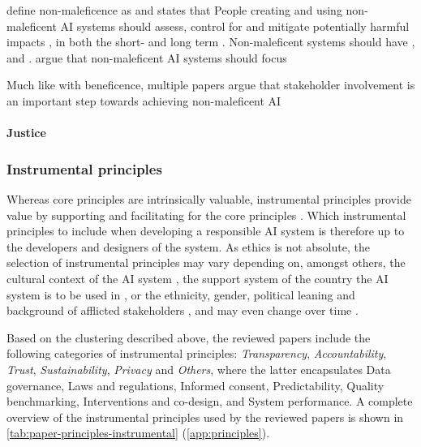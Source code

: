 \textcite[p. 6]{Doorn_2021} define non-maleficence as  and states that  People creating and using non-maleficent AI systems should assess, control for and mitigate potentially harmful impacts \parencite[p. 2]{Buhmann_2021}, in both the short- and long term \parencite[p. 416]{Clarke_2019}. Non-maleficent systems should have  \parencite[p. 416]{Clarke_2019}, and  \parencite[p. 2]{Buhmann_2021}. \textcite[p. 13]{Anagnostou_2022} argue that non-maleficent AI systems should focus  %


Much like with beneficence, multiple papers argue that stakeholder involvement is an important step towards achieving non-maleficent AI \parencite[p. 416]{Clarke_2019}


\paragraph{Justice}


\subsubsection{Instrumental principles}
Whereas core principles are intrinsically valuable, instrumental principles provide value by supporting and facilitating for the core principles \parencite{Canca_2020}. Which instrumental principles to include when developing a responsible AI system is therefore up to the developers and designers of the system. As ethics is not absolute, the selection of instrumental principles may vary depending on, amongst others, the cultural context of the AI system \parencite{vanBruxvoort_2021}, the support system of the country the AI system is to be used in \parencite{Wright_2018}, or the ethnicity, gender, political leaning and background of afflicted stakeholders \parencite{Jakesch_2022}, and may even change over time \parencite{vanBruxvoort_2021}.

Based on the clustering described above, the reviewed papers include the following categories of instrumental principles: \textit{Transparency}, \textit{Accountability}, \textit{Trust}, \textit{Sustainability}, \textit{Privacy} and \textit{Others}, where the latter encapsulates Data governance, Laws and regulations, Informed consent, Predictability, Quality benchmarking, Interventions and co-design, and System performance. A complete overview of the instrumental principles used by the reviewed papers is shown in \autoref{tab:paper-principles-instrumental} (\autoref{app:principles}).

